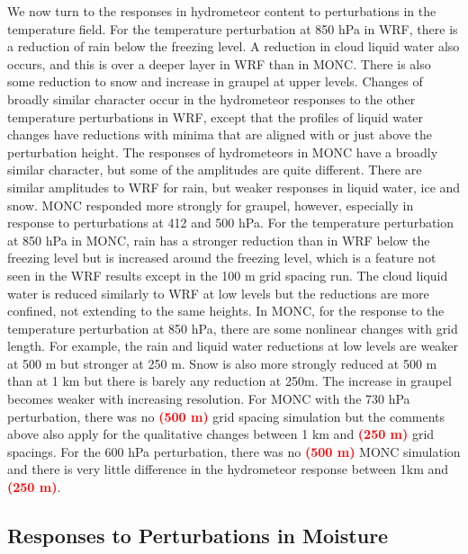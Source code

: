 \documentclass[draft]{agujournal2019}
\newcommand{\todo}[1]{\textcolor{red}{\textbf{(#1)}}}
\begin{document}
We now turn to the responses in hydrometeor content to perturbations in the
temperature field. For the temperature perturbation at 850 hPa in WRF, there is
a reduction of rain below the freezing level. A reduction in cloud liquid water
also occurs, and this is over a deeper layer in WRF than in MONC. There is also
some reduction to snow and increase in graupel at upper levels. Changes of
broadly similar character occur in the hydrometeor responses to the other
temperature perturbations in WRF, except that the profiles of liquid water
changes have reductions with minima that are aligned with or just above the
perturbation height. The responses of hydrometeors in MONC have a broadly
similar character, but some of the amplitudes are quite different. There are
similar amplitudes to WRF for rain, but weaker responses in liquid water, ice
and snow. MONC responded more strongly for graupel, however, especially in
response to perturbations at 412 and 500 hPa. For the temperature perturbation
at 850 hPa in MONC, rain has a stronger reduction than in WRF below the freezing
level but is increased around the freezing level, which is a feature not seen in
the WRF results except in the 100 m grid spacing run. The cloud liquid water is
reduced similarly to WRF at low levels but the reductions are more confined, not
extending to the same heights. In MONC, for the response to the temperature
perturbation at 850 hPa, there are some nonlinear changes with grid length. For
example, the rain and liquid water reductions at low levels are weaker at 500 m
but stronger at 250 m.  Snow is also more strongly reduced at 500 m than at 1 km
but there is barely any reduction at 250m. The increase in graupel becomes
weaker with increasing resolution. For MONC with the 730 hPa perturbation, there
was no \todo{500 m} grid spacing simulation but the comments above also apply
for the qualitative changes between 1 km and \todo{250 m} grid spacings. For the
600 hPa perturbation, there was no \todo{500 m} MONC simulation and there is
very little difference in the hydrometeor response between 1km and \todo{250 m}.

\subsection{Responses to Perturbations in Moisture}
\end{document}
